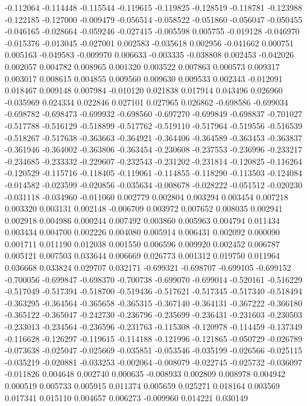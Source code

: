 -0.112064
-0.114448
-0.115544
-0.119615
-0.119825
-0.128519
-0.118781
-0.123988
-0.122185
-0.127000
-0.009479
-0.056514
-0.058522
-0.051860
-0.056047
-0.050455
-0.046165
-0.028664
-0.059246
-0.027415
-0.005598
0.005755
-0.019128
-0.046970
-0.015376
-0.013045
-0.027001
0.002583
-0.035618
0.002956
-0.041662
0.000751
0.005163
-0.049583
-0.009970
0.006633
-0.003335
-0.038808
0.002453
-0.042026
0.002057
0.004782
0.008965
0.001320
0.003522
0.007863
0.000573
0.009317
0.003017
0.008615
0.004855
0.009560
0.009630
0.009533
0.002343
-0.012091
0.018467
0.009148
0.007984
-0.010120
0.021838
0.017914
0.043496
0.026960
-0.035969
0.024334
0.022846
0.027101
0.027965
0.026862
-0.698586
-0.699034
-0.698782
-0.698473
-0.699932
-0.698560
-0.697270
-0.699849
-0.698837
-0.701027
-0.517788
-0.516129
-0.518899
-0.517762
-0.519110
-0.517964
-0.519556
-0.516539
-0.518267
-0.517638
-0.363663
-0.364921
-0.364406
-0.364589
-0.363453
-0.363837
-0.361946
-0.364002
-0.363806
-0.363454
-0.230608
-0.237553
-0.236996
-0.233217
-0.234685
-0.233332
-0.229607
-0.232543
-0.231202
-0.231814
-0.120825
-0.116264
-0.120529
-0.115716
-0.118405
-0.119061
-0.114855
-0.118290
-0.113503
-0.124084
-0.014582
-0.023599
-0.020856
-0.035634
-0.008678
-0.028222
-0.051512
-0.020230
-0.031118
-0.034960
-0.011060
0.002779
0.002804
0.003294
0.003454
0.007218
0.003320
0.003131
0.002148
-0.006709
0.003972
0.007652
0.008035
0.002941
0.002918
0.004986
0.000244
0.007492
0.003860
0.005963
0.004794
0.011434
0.003434
0.004700
0.002226
0.004080
0.005914
0.006431
0.002092
0.000090
0.001711
0.011190
0.012038
0.001550
0.006596
0.009920
0.002452
0.006787
0.005121
0.007503
0.033644
0.006669
0.026773
0.001312
0.019750
0.011964
0.036668
0.033824
0.029707
0.032171
-0.699321
-0.698707
-0.699105
-0.699152
-0.700056
-0.699847
-0.698370
-0.700738
-0.699070
-0.699014
-0.520161
-0.516229
-0.517049
-0.517394
-0.518700
-0.519436
-0.517621
-0.517345
-0.517340
-0.518494
-0.363295
-0.364564
-0.365658
-0.365315
-0.367140
-0.364131
-0.367222
-0.366180
-0.365122
-0.365047
-0.242730
-0.236796
-0.235699
-0.236431
-0.231603
-0.230503
-0.233013
-0.234564
-0.236596
-0.231763
-0.115308
-0.120978
-0.114459
-0.137349
-0.116628
-0.126297
-0.119615
-0.114188
-0.121996
-0.121865
-0.050729
-0.026789
-0.073638
-0.025047
-0.025669
-0.035851
-0.053546
-0.035199
-0.026566
-0.025115
-0.035219
-0.020881
-0.033253
-0.002064
-0.008079
-0.022745
-0.025732
-0.036097
-0.011826
0.004648
0.002740
0.000635
-0.008933
0.002809
0.008978
0.004942
0.000519
0.005733
0.005915
0.011374
0.005659
0.025271
0.018164
0.003569
0.017341
0.015110
0.004657
0.006273
-0.009960
0.014221
0.030149
